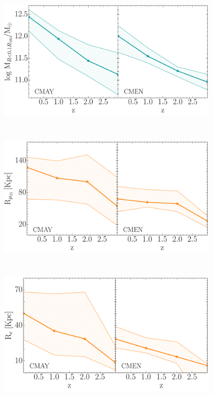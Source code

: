 \begin{figure}[H]
 \centering
 \includegraphics[height=7cm, width=14cm]{../al_final/LR/evolucion/simulacion/evolucion_M10_grandes_chicas.pdf}
\end{figure}


\begin{figure}[H]
 \centering
 \includegraphics[height=7cm, width=14cm]{../al_final/LR/evolucion/observacional/evolucion_R24.pdf}
\end{figure}

\begin{figure}[H]
 \centering
 \includegraphics[height=7cm, width=14cm]{../al_final/LR/evolucion/observacional/evolucion_Re.pdf}
\end{figure}


